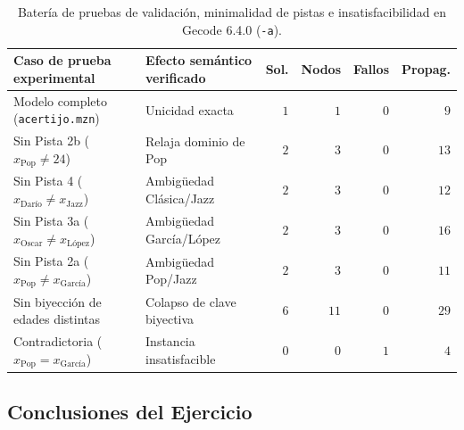 \begin{table}[htbp]
    \centering
    \small
    \setlength{\tabcolsep}{3.8pt}
    \begin{tabular}{llrrrr}
        \toprule
        Caso de prueba experimental & Efecto semántico verificado & Sol. & Nodos & Fallos & Propag. \\
        \midrule
        Modelo completo (\texttt{acertijo.mzn})      & Unicidad exacta            & $1$ & $1$  & $0$ & $9$  \\
        Sin Pista 2b ($x_{\text{Pop}} \neq 24$)      & Relaja dominio de Pop      & $2$ & $3$  & $0$ & $13$ \\
        Sin Pista 4 ($x_{\text{Darío}} \neq x_{\text{Jazz}}$) & Ambigüedad Clásica/Jazz & $2$ & $3$  & $0$ & $12$ \\
        Sin Pista 3a ($x_{\text{Oscar}} \neq x_{\text{López}}$)& Ambigüedad García/López& $2$ & $3$  & $0$ & $16$ \\
        Sin Pista 2a ($x_{\text{Pop}} \neq x_{\text{García}}$) & Ambigüedad Pop/Jazz    & $2$ & $3$  & $0$ & $11$ \\
        Sin biyección de edades distintas            & Colapso de clave biyectiva & $6$ & $11$ & $0$ & $29$ \\
        Contradictoria ($x_{\text{Pop}} = x_{\text{García}}$) & Instancia insatisfacible & $0$ & $0$  & $1$ & $4$  \\
        \bottomrule
    \end{tabular}
    \caption{Batería de pruebas de validación, minimalidad de pistas e insatisfacibilidad en Gecode 6.4.0 (\texttt{-a}).}
    \label{tab:acertijo_ablacion_pistas}
\end{table}

\subsection{Conclusiones del Ejercicio}

